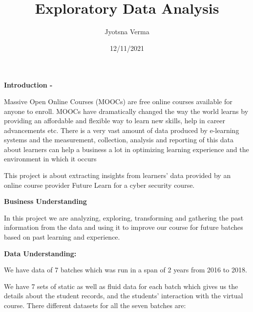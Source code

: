 \documentclass[
]{article}
\title{Exploratory Data Analysis}
\author{Jyotsna Verma}
\date{12/11/2021}
\begin{document}
\maketitle

\textbf{Introduction - }

Massive Open Online Courses (MOOCs) are free online courses available
for anyone to enroll. MOOCs have dramatically changed the way the world
learns by providing an affordable and flexible way to learn new skills,
help in career advancements etc. There is a very vast amount of data
produced by e-learning systems and the measurement, collection, analysis
and reporting of this data about learners can help a business a lot in
optimizing learning experience and the environment in which it occurs

This project is about extracting insights from learners' data provided
by an online course provider Future Learn for a cyber security course.

\textbf{Business Understanding }

In this project we are analyzing, exploring, transforming and gathering
the past information from the data and using it to improve our course
for future batches based on past learning and experience.

\textbf{Data Understanding:}

We have data of 7 batches which was run in a span of 2 years from 2016
to 2018.

We have 7 sets of static as well as fluid data for each batch which
gives us the details about the student records, and the students'
interaction with the virtual course. There different datasets for all
the seven batches are:
\end{document}
